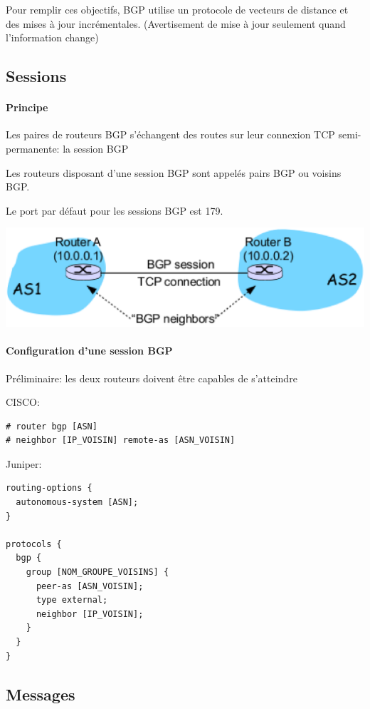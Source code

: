 \documentclass{report}
\begin{document}
Pour remplir ces objectifs, BGP utilise un protocole de vecteurs de
distance et des mises à jour incrémentales. (Avertisement de mise à
jour seulement quand l'information change)

\subsection{Sessions}

\paragraph{Principe}

Les paires de routeurs BGP s'échangent des routes sur leur connexion
TCP semi-permanente: la session BGP

Les routeurs disposant d'une session BGP sont appelés pairs BGP ou
voisins BGP.

Le port par défaut pour les sessions BGP est 179.

\includegraphics[width=\textwidth]{bgpsession.eps}

\paragraph{Configuration d'une session BGP}

Préliminaire: les deux routeurs doivent être capables de s'atteindre

CISCO:

\begin{verbatim}
# router bgp [ASN]
# neighbor [IP_VOISIN] remote-as [ASN_VOISIN]
\end{verbatim}

Juniper:

\begin{verbatim}
routing-options {
  autonomous-system [ASN];
}

protocols {
  bgp {
    group [NOM_GROUPE_VOISINS] {
      peer-as [ASN_VOISIN];
      type external;
      neighbor [IP_VOISIN];
    }
  }
}
\end{verbatim}

\subsection{Messages}
\end{document}
